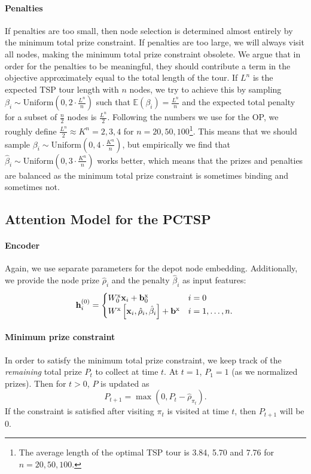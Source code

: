 \paragraph{Penalties}
If penalties are too small, then node selection is determined almost entirely by the minimum total prize constraint. If penalties are too large, we will always visit all nodes, making the minimum total prize constraint obsolete. We argue that in order for the penalties to be meaningful, they should contribute a term in the objective approximately equal to the total length of the tour. If $L^n$ is the expected TSP tour length with $n$ nodes, we try to achieve this by sampling $\beta_i \sim \text{Uniform}(0, 2 \cdot \frac{L^n}{n})$ such that $\mathbb{E}(\beta_i) = \frac{L^n}{n}$ and the expected total penalty for a subset of $\frac{n}{2}$ nodes is $\frac{L^n}{2}$. Following the numbers we use for the OP, we roughly define $\frac{L^n}{2} \approx K^n = 2, 3, 4$ for $n= 20, 50, 100$\footnote{The average length of the optimal TSP tour is 3.84, 5.70 and 7.76 for $n=20, 50, 100$.}. This means that we should sample $\beta_i \sim \text{Uniform}(0, 4 \cdot \frac{K^n}{n})$, but empirically we find that $\hat{\beta}_i \sim \text{Uniform}(0, 3 \cdot \frac{K^n}{n})$ works better, which means that the prizes and penalties are balanced as the minimum total prize constraint is sometimes binding and sometimes not.

\subsection{Attention Model for the PCTSP}

\paragraph{Encoder}
Again, we use separate parameters for the depot node embedding. Additionally, we provide the node prize $\hat{\rho}_i$ and the penalty $\hat{\beta}_i$ as input features:
\begin{equation}
\mathbf{h}_i^{(0)} = \begin{cases}
		W_0^{\text{x}} \mathbf{x}_i + \mathbf{b}_0^{\text{x}} & i = 0 \\
        W^{\text{x}} \left[\mathbf{x}_i, \hat{\rho}_i, \hat{\beta}_i\right] + \mathbf{b}^{\text{x}} & i = 1, \ldots, n.
\end{cases} \\
\end{equation}

\paragraph{Minimum prize constraint}
In order to satisfy the minimum total prize constraint, we keep track of the \emph{remaining} total prize $P_t$ to collect at time $t$. At $t = 1$, $P_1 = 1$ (as we normalized prizes). Then for $t > 0$, $P$ is updated as
\begin{equation}
\label{eq:pctsp_remaining_minimum_prize_constraint}
    P_{t+1} = \max(0, P_{t} - \hat{\rho}_{\pi_t}).
\end{equation}
If the constraint is satisfied after visiting $\pi_t$ is visited at time $t$, then $P_{t+1}$ will be 0.

